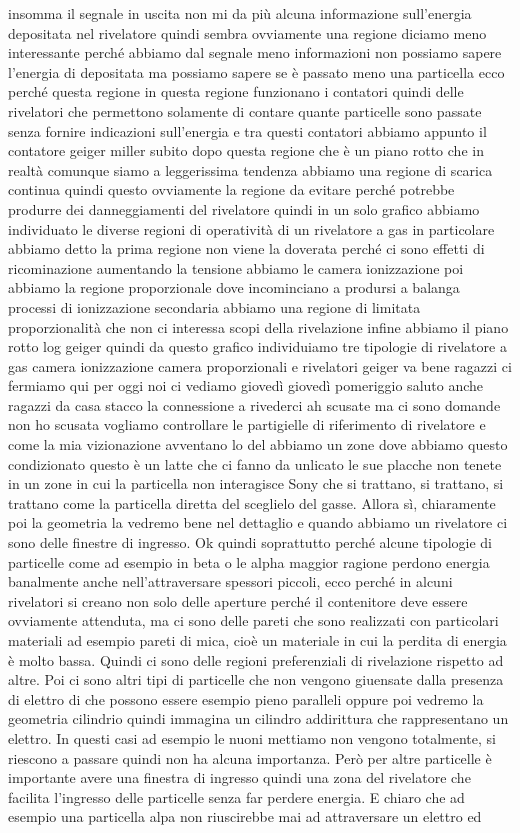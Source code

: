 insomma il segnale in uscita non mi da più alcuna informazione sull'energia depositata nel rivelatore quindi sembra ovviamente una regione diciamo meno interessante perché abbiamo dal segnale meno informazioni non possiamo sapere l'energia di depositata ma possiamo sapere se è passato meno una particella ecco perché questa regione in questa regione funzionano i contatori quindi delle rivelatori che permettono solamente di contare quante particelle sono passate senza fornire indicazioni sull'energia e tra questi contatori abbiamo appunto il contatore geiger miller subito dopo questa regione che è un piano rotto che in realtà comunque siamo a leggerissima tendenza abbiamo una regione di scarica continua quindi questo ovviamente la regione da evitare perché potrebbe produrre dei danneggiamenti del rivelatore quindi in un solo grafico abbiamo individuato le diverse regioni di operatività di un rivelatore a gas in particolare abbiamo detto la prima regione non viene la doverata perché ci sono effetti di ricominazione aumentando la tensione abbiamo le camera ionizzazione poi abbiamo la regione proporzionale dove incominciano a prodursi a balanga processi di ionizzazione secondaria abbiamo una regione di limitata proporzionalità che non ci interessa scopi della rivelazione infine abbiamo il piano rotto log geiger quindi da questo grafico individuiamo tre tipologie di rivelatore a gas camera ionizzazione camera proporzionali e rivelatori geiger va bene ragazzi ci fermiamo qui per oggi noi ci vediamo giovedì giovedì pomeriggio saluto anche ragazzi da casa stacco la connessione a rivederci ah scusate ma ci sono domande non ho scusata vogliamo controllare le partigielle di riferimento di rivelatore e come la mia vizionazione avventano lo del abbiamo un zone dove abbiamo questo condizionato questo è un latte che ci fanno da unlicato le sue placche non tenete in un zone in cui la particella non interagisce Sony che si trattano, si trattano, si trattano come la particella diretta del sceglielo del gasse. Allora sì, chiaramente poi la geometria la vedremo bene nel dettaglio e quando abbiamo un rivelatore ci sono delle finestre di ingresso. Ok quindi soprattutto perché alcune tipologie di particelle come ad esempio in beta o le alpha maggior ragione perdono energia banalmente anche nell'attraversare spessori piccoli, ecco perché in alcuni rivelatori si creano non solo delle aperture perché il contenitore deve essere ovviamente attenduta, ma ci sono delle pareti che sono realizzati con particolari materiali ad esempio pareti di mica, cioè un materiale in cui la perdita di energia è molto bassa. Quindi ci sono delle regioni preferenziali di rivelazione rispetto ad altre. Poi ci sono altri tipi di particelle che non vengono giuensate dalla presenza di elettro di che possono essere esempio pieno paralleli oppure poi vedremo la geometria cilindrio quindi immagina un cilindro addirittura che rappresentano un elettro. In questi casi ad esempio le nuoni mettiamo non vengono totalmente, si riescono a passare quindi non ha alcuna importanza. Però per altre particelle è importante avere una finestra di ingresso quindi una zona del rivelatore che facilita l'ingresso delle particelle senza far perdere energia. E chiaro che ad esempio una particella alpa non riuscirebbe mai ad attraversare un elettro ed 